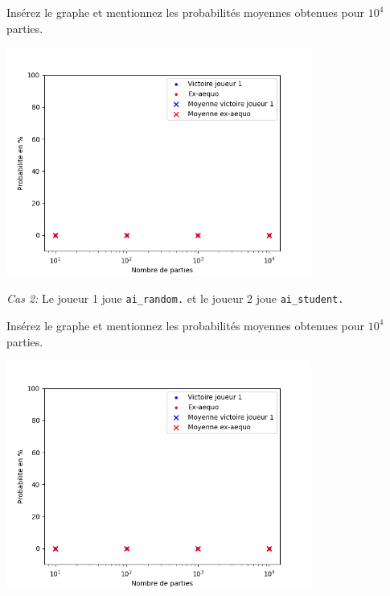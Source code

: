 \documentclass[11pt,answers]{exam}
\begin{document}
\begin{solutionbox}{100mm}
Insérez le graphe et mentionnez les probabilités moyennes obtenues pour $10^4$ parties.

\centering
\includegraphics[width=0.75\textwidth]{MCplot_empty.png}
\end{solutionbox}

\medskip

\emph{Cas 2:} Le joueur 1 joue \texttt{ai\_random.} et le joueur 2 joue \texttt{ai\_student.}

\begin{solutionbox}{100mm}
Insérez le graphe et mentionnez les probabilités moyennes obtenues pour $10^4$ parties.

\centering
\includegraphics[width=0.75\textwidth]{MCplot_empty.png}
\end{solutionbox}
\end{document}
